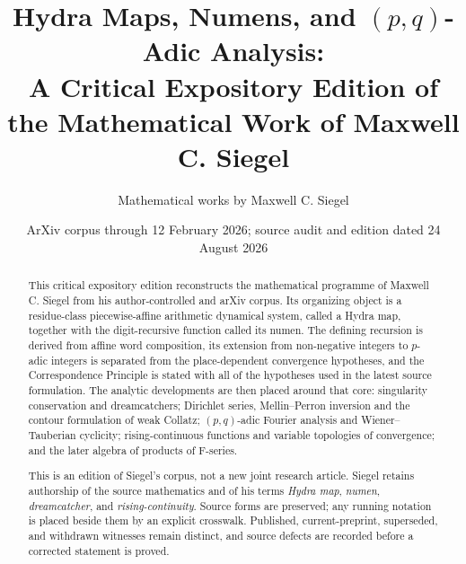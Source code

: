 \documentclass[11pt,reqno]{amsart}
\title[Hydra maps, numens, and $(p,q)$-adic analysis]
{Hydra Maps, Numens, and $(p,q)$-Adic Analysis:\\
A Critical Expository Edition of the Mathematical Work of Maxwell C. Siegel}
\author{Mathematical works by Maxwell C. Siegel}
\date{ArXiv corpus through 12 February 2026; source audit and edition dated
24 August 2026}
\theoremstyle{definition}
\theoremstyle{remark}
\begin{document}
\begin{abstract}
This critical expository edition reconstructs the mathematical programme of
Maxwell C. Siegel from his author-controlled and arXiv corpus.  Its organizing
object is a residue-class piecewise-affine arithmetic dynamical system, called
a Hydra map, together with the digit-recursive function called its numen.
The defining recursion is derived from affine word composition, its extension
from non-negative integers to $p$-adic integers is separated from the
place-dependent convergence hypotheses, and the Correspondence Principle is
stated with all of the hypotheses used in the latest source formulation.
The analytic developments are then placed around that core: singularity
conservation and dreamcatchers; Dirichlet series, Mellin--Perron inversion and
the contour formulation of weak Collatz; $(p,q)$-adic Fourier analysis and
Wiener--Tauberian cyclicity; rising-continuous functions and variable
topologies of convergence; and the later algebra of products of F-series.

This is an edition of Siegel's corpus, not a new joint research article.
Siegel retains authorship of the source mathematics and of his terms
\emph{Hydra map}, \emph{numen}, \emph{dreamcatcher}, and
\emph{rising-continuity}.  Source forms are preserved; any running notation
is placed beside them by an explicit crosswalk.  Published, current-preprint,
superseded, and withdrawn witnesses remain distinct, and source defects are
recorded before a corrected statement is proved.
\end{abstract}

\maketitle
\tableofcontents













\end{document}
